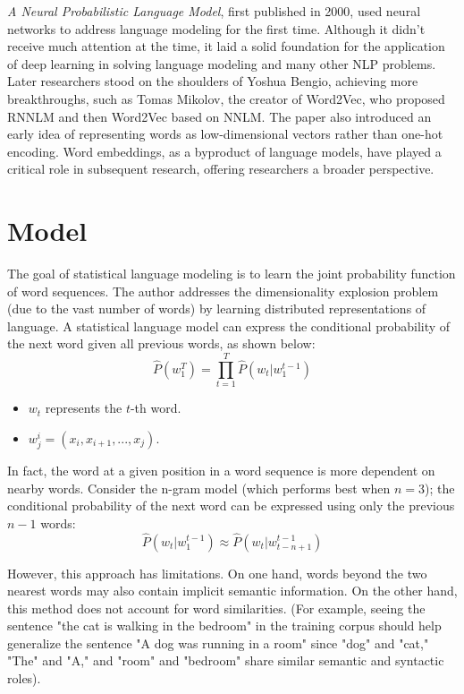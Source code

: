 \documentclass[11p,oneside]{book}
\begin{document}
\textit{A Neural Probabilistic Language Model}, first published in 2000, used neural networks to address language modeling for the first time. Although it didn’t receive much attention at the time, it laid a solid foundation for the application of deep learning in solving language modeling and many other NLP problems. Later researchers stood on the shoulders of Yoshua Bengio, achieving more breakthroughs, such as Tomas Mikolov, the creator of Word2Vec, who proposed RNNLM and then Word2Vec based on NNLM. The paper also introduced an early idea of representing words as low-dimensional vectors rather than one-hot encoding. Word embeddings, as a byproduct of language models, have played a critical role in subsequent research, offering researchers a broader perspective.

\section*{Model}

The goal of statistical language modeling is to learn the joint probability function of word sequences. The author addresses the dimensionality explosion problem (due to the vast number of words) by learning distributed representations of language. A statistical language model can express the conditional probability of the next word given all previous words, as shown below:
\[
\hat{P}(w_1^T) = \prod_{t=1}^T \hat{P}(w_t|w_1^{t-1})
\]
\begin{itemize}
    \item $w_t$ represents the $t$-th word.
    \item $w_j^i = (x_{i}, x_{i+1}, ..., x_{j})$.
\end{itemize}

In fact, the word at a given position in a word sequence is more dependent on nearby words. Consider the n-gram model (which performs best when $n = 3$); the conditional probability of the next word can be expressed using only the previous $n-1$ words:
\[
\hat{P}(w_t|w_1^{t-1}) \approx \hat{P}(w_t|w_{t-n+1}^{t-1})
\]

However, this approach has limitations. On one hand, words beyond the two nearest words may also contain implicit semantic information. On the other hand, this method does not account for word similarities. (For example, seeing the sentence "the cat is walking in the bedroom" in the training corpus should help generalize the sentence "A dog was running in a room" since "dog" and "cat," "The" and "A," and "room" and "bedroom" share similar semantic and syntactic roles).
\end{document}
